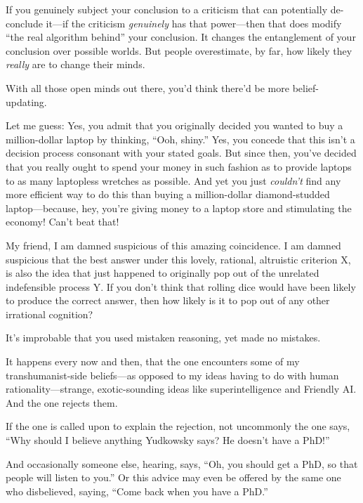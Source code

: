 {
 If you genuinely subject your conclusion to a criticism that can
potentially de-conclude it---if the criticism \textit{genuinely} has
that power---then that does modify ``the real
algorithm behind'' your conclusion. It changes the
entanglement of your conclusion over possible worlds. But people
overestimate, by far, how likely they \textit{really} are to change
their minds.}

{
 With all those open minds out there, you'd think
there'd be more belief-updating.}

{
 Let me guess: Yes, you admit that you originally decided you
wanted to buy a million-dollar laptop by thinking,
``Ooh, shiny.'' Yes, you concede
that this isn't a decision process consonant with your
stated goals. But since then, you've decided that you
really ought to spend your money in such fashion as to provide laptops
to as many laptopless wretches as possible. And yet you just
\textit{couldn't} find any more efficient way to do
this than buying a million-dollar diamond-studded laptop---because,
hey, you're giving money to a laptop store and
stimulating the economy! Can't beat that!}

{
 My friend, I am damned suspicious of this amazing coincidence. I
am damned suspicious that the best answer under this lovely, rational,
altruistic criterion X, is also the idea that just happened to
originally pop out of the unrelated indefensible process Y. If you
don't think that rolling dice would have been likely to
produce the correct answer, then how likely is it to pop out of any
other irrational cognition?}

{
 It's improbable that you used mistaken reasoning,
yet made no mistakes.}

\myendsectiontext


{
 It happens every now and then, that the one encounters some of my
transhumanist-side beliefs---as opposed to my ideas having to do with
human rationality---strange, exotic-sounding ideas like
superintelligence and Friendly AI. And the one rejects them. }

{
 If the one is called upon to explain the rejection, not uncommonly
the one says, ``Why should I believe anything
Yudkowsky says? He doesn't have a
PhD!''}

{
 And occasionally someone else, hearing, says,
``Oh, you should get a PhD, so that people will listen
to you.'' Or this advice may even be offered by the
same one who disbelieved, saying, ``Come back when you
have a PhD.''}

